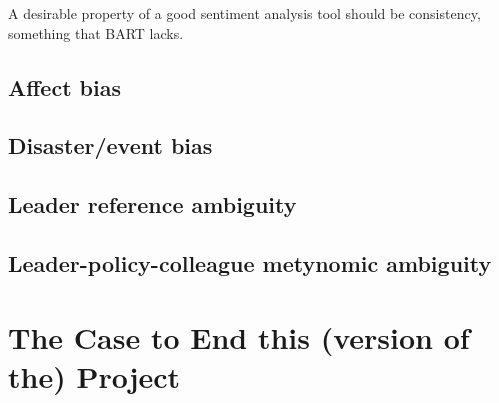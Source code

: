 \documentclass[11pt, letterpaper, twoside]{article}
\begin{document}
        A desirable property of a good sentiment analysis tool should be consistency, something that BART lacks.

    \subsection{Affect bias}
        

    \subsection{Disaster/event bias}

    \subsection{Leader reference ambiguity}

    \subsection{Leader-policy-colleague metynomic ambiguity}


\section{The Case to End this (version of the) Project}
\end{document}
